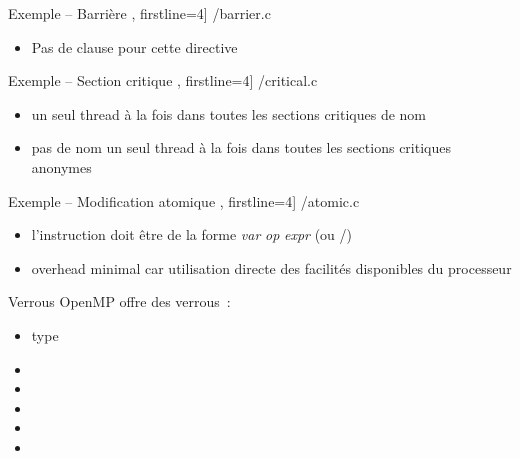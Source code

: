 
\begin {frame} [fragile] {Exemple \theompexemple{} -- Barrière}
    \scriptsize\lstmonstyle, firstline=4] {\inc/barrier.c}

    \begin {itemize}
	\item Pas de clause pour cette directive

    \end {itemize}
\end{frame}



\begin {frame} [fragile] {Exemple \theompexemple{} -- Section critique}
    \scriptsize\lstmonstyle, firstline=4] {\inc/critical.c}

    \begin {itemize}
	\item un seul thread à la fois dans toutes les sections
	    critiques de nom 

	\item pas de nom \implique un seul thread à la fois
	    dans toutes les sections critiques anonymes

    \end {itemize}
\end{frame}



\begin {frame} [fragile] {Exemple \theompexemple{} -- Modification atomique}
    \scriptsize\lstmonstyle, firstline=4] {\inc/atomic.c}

    \begin {itemize}
	\item l'instruction doit être de la forme \emph {var} \emph
	    {op}\code {=} \emph {expr} (ou \code {++}/\code {-{}-})

	\item overhead minimal car utilisation directe des facilités
	    disponibles du processeur

    \end {itemize}
\end{frame}


\begin {frame} {Verrous}
    OpenMP offre des verrous~:

    \begin {itemize}
	\item type 
	\item {}
	\item {}
	\item {}
	\item {}
	\item {}

    \end {itemize}
\end {frame}

